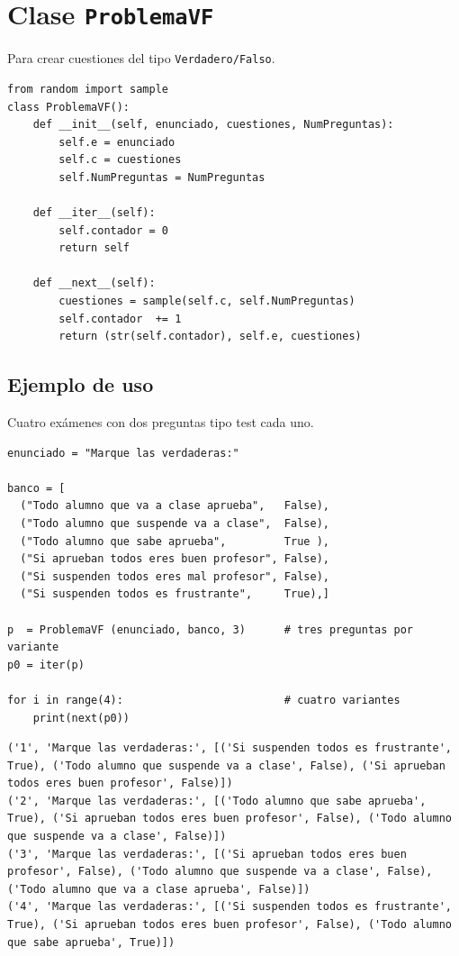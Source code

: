\documentclass[10pt,a4paper]{report}
\begin{document}
\chapter{Clase \texttt{ProblemaVF}}
\label{sec:orgdefb2b7}

Para crear cuestiones del tipo \texttt{Verdadero/Falso}.

\begin{verbatim}
from random import sample
class ProblemaVF():
    def __init__(self, enunciado, cuestiones, NumPreguntas):
        self.e = enunciado
        self.c = cuestiones
        self.NumPreguntas = NumPreguntas

    def __iter__(self):
        self.contador = 0
        return self

    def __next__(self):
        cuestiones = sample(self.c, self.NumPreguntas)
        self.contador  += 1
        return (str(self.contador), self.e, cuestiones)

\end{verbatim}
\section{Ejemplo de uso}
\label{sec:org9cfb59b}

Cuatro exámenes con dos preguntas tipo test cada uno.
\begin{verbatim}
enunciado = "Marque las verdaderas:"

banco = [
  ("Todo alumno que va a clase aprueba",   False),
  ("Todo alumno que suspende va a clase",  False),
  ("Todo alumno que sabe aprueba",         True ),
  ("Si aprueban todos eres buen profesor", False),
  ("Si suspenden todos eres mal profesor", False),
  ("Si suspenden todos es frustrante",     True),]

p  = ProblemaVF (enunciado, banco, 3)      # tres preguntas por variante
p0 = iter(p)

for i in range(4):                         # cuatro variantes
    print(next(p0))
\end{verbatim}

\label{Ejemplo de ProblemaVF}
\begin{verbatim}
('1', 'Marque las verdaderas:', [('Si suspenden todos es frustrante', True), ('Todo alumno que suspende va a clase', False), ('Si aprueban todos eres buen profesor', False)])
('2', 'Marque las verdaderas:', [('Todo alumno que sabe aprueba', True), ('Si aprueban todos eres buen profesor', False), ('Todo alumno que suspende va a clase', False)])
('3', 'Marque las verdaderas:', [('Si aprueban todos eres buen profesor', False), ('Todo alumno que suspende va a clase', False), ('Todo alumno que va a clase aprueba', False)])
('4', 'Marque las verdaderas:', [('Si suspenden todos es frustrante', True), ('Si aprueban todos eres buen profesor', False), ('Todo alumno que sabe aprueba', True)])
\end{verbatim}
\end{document}
